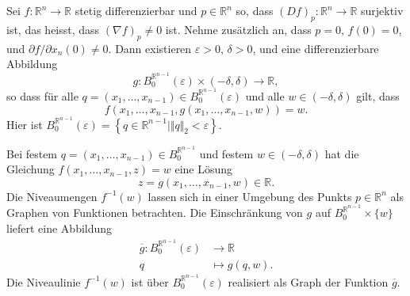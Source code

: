 \documentclass[../main.tex]{subfiles}
\begin{document}
\begin{theorem}
  Sei $f \colon \mathbb{R}^n \to \mathbb{R}$ 
  stetig differenzierbar und $p \in \mathbb{R}^n$ 
  so, dass ${(Df)}_p \colon \mathbb{R}^n \to \mathbb{R}$ surjektiv ist,
  das heisst, dass ${(\nabla f)}_p \neq 0$ ist.
  Nehme zusätzlich an, dass $p = 0$, $f(0) = 0$,
  und $\partial f/ \partial x_n (0) \neq 0$.
  Dann existieren $\varepsilon > 0$, $\delta > 0$,
  und eine differenzierbare Abbildung
  \[
  g \colon B_0^{\mathbb{R}^{n-1}}(\varepsilon) \times (-\delta, \delta)
  \to \mathbb{R},
  \]
  so dass für alle 
  $q = (x_1, \dots, x_{n-1}) \in B_0^{\mathbb{R}^{n-1}}(\varepsilon)$ 
  und alle $w \in (-\delta, \delta)$ gilt, dass
  \[
  f(x_1, \dots, x_{n-1}, g(x_1, \dots, x_{n-1}, w)) = w.
  \]
  Hier ist $B_0^{\mathbb{R}^{n-1}}(\varepsilon)
  = \left\{q \in\mathbb{R}^{n-1} \mid \Vert q \Vert_2 < \varepsilon \right\}$.
\end{theorem}

\begin{geometric}
  Bei festem $q = (x_1, \dots, x_{n-1}) \in B_0^{\mathbb{R}^{n-1}}$ 
  und festem $w \in (-\delta, \delta)$ hat die Gleichung
  $f(x_1, \dots, x_{n-1}, z) = w$ eine Lösung
  \[
  z = g(x_1, \dots, x_{n-1}, w) \in \mathbb{R}.
  \]
  Die Niveaumengen $f^{-1}(w)$ lassen sich in einer
  Umgebung des Punkts $p \in \mathbb{R}^n$ 
  als Graphen von Funktionen betrachten.
  Die Einschränkung von $g$ auf $B_0^{\mathbb{R}^{n-1}} \times \{w\}$
  liefert eine Abbildung
  \begin{align*}
    \overline g \colon B_0^{\mathbb{R}^{n-1}}(\varepsilon) & \to \mathbb{R} \\
    q & \mapsto g(q, w).
  \end{align*}
  Die Niveaulinie $f^{-1}(w)$ ist über
  $B_0^{\mathbb{R}^{n-1}}(\varepsilon)$ realisiert als Graph der
  Funktion $\overline g$.
\end{geometric}
\end{document}
